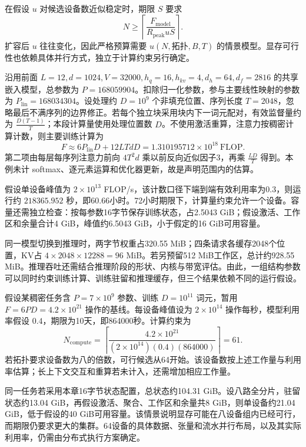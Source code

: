 \documentclass[../textbook.tex]{subfiles}
\begin{document}
在假设 $u$ 对候选设备数近似稳定时，期限 $S$ 要求
\begin{equation}
 N\ge\left\lceil\frac{F_{\mathrm{model}}}{R_{\mathrm{peak}}uS}\right\rceil.
\end{equation}
扩容后 $u$ 往往变化，因此严格预算需要 $u(N,\text{拓扑},B,T)$ 的情景模型。显存可行性也依赖具体并行方式，独立于计算约束另行确定。

\begin{example}[同一模型的训练与推理预算]
\label{sec:budget-unified-example}
沿用前面 $L=12,d=1024,V=32000,h_q=16,h_{kv}=4,d_h=64,d_f=2816$ 的共享嵌入模型，总参数为 $P=168059904$。扣除归一化参数，参与主要线性映射的参数为 $P_{\mathrm{lin}}=168034304$。设处理约 $D=10^9$ 个非填充位置、序列长度 $T=2048$，忽略最后不满序列的边界修正。若每个独立块采用块内下一词元配对，有效监督量约为 $\frac{D(T-1)}{T}$；本段计算量使用处理位置数 $D$。不使用激活重算，注意力按稠密计算计数，则主要训练计算为
\begin{equation*}
 F\approx6P_{\mathrm{lin}}D+12LTdD
 =1.310195712\times10^{18}\ \mathrm{FLOP}.
\end{equation*}
第二项由每层每序列注意力前向 $4T^2d$ 乘以前反向近似因子3，再乘 $\frac{LD}{T}$ 得到。本例未计 softmax、逐元素运算和优化器更新，故是声明范围内的估算。

假设单设备峰值为 $2\times10^{13}$ FLOP/s，该计数口径下端到端有效利用率为0.3，则运行约 $218365.952$ 秒，即60.66小时。72小时期限下，计算量约束允许一个设备。容量还需独立检查：按每参数16字节保存训练状态，占2.5043 GiB；假设激活、工作区和余量合计4 GiB，峰值约6.5043 GiB，小于假定的16 GiB可用容量。

同一模型切换到推理时，两字节权重占320.55 MiB；四条请求各缓存2048个位置，KV占 $4\times2048\times12288=96$ MiB。若另预留512 MiB工作区，总计约928.55 MiB。推理吞吐还需结合推理阶段的形状、内核与带宽评估。由此，一组结构参数可以同时约束训练计算、训练驻留和推理缓存，但三个结果依赖不同的运行假设。
\end{example}

\begin{example}[计算、带宽与容量的联合预算]
假设某稠密任务含 $P=7\times10^9$ 参数、训练 $D=10^{11}$ 词元，暂用 $F=6PD=4.2\times10^{21}$ 操作的基线。每设备峰值设为 $2\times10^{14}$ 操作每秒，模型利用率假设 $0.4$，期限为10天，即864000秒。计算约束为
\begin{equation*}
 N_{\mathrm{compute}}=\left\lceil
 \frac{4.2\times10^{21}}{(2\times10^{14})(0.4)(864000)}
 \right\rceil=61.
\end{equation*}
若拓扑要求设备数为八的倍数，可行候选从64开始。该设备数按上述工作量与利用率估算；长上下文交互和重算若未计入，还需增加相应工作量。

同一任务若采用本章16字节状态配置，总状态约104.31 GiB。设八路全分片，驻留状态约13.04 GiB，再假设激活、聚合、工作区和余量共8 GiB，则单设备约21.04 GiB，低于假设的40 GiB可用容量。该情景说明显存可能在八设备组内已经可行，而期限仍要求更大的集群。64设备的具体数据、张量和流水并行布局，以及其实际利用率，仍需由分布式执行方案确定。
\end{example}
\end{document}
